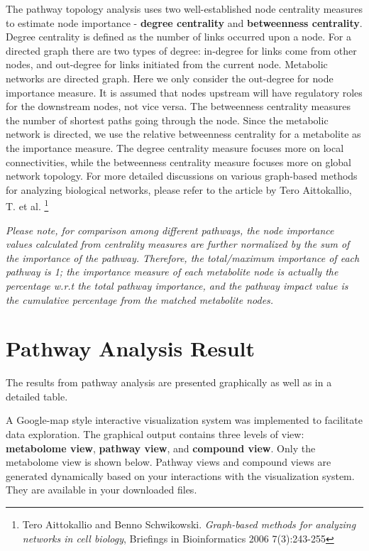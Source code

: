 \documentclass[a4paper]{article}
\begin{document}
The pathway topology analysis uses two well-established node centrality measures to estimate node importance - \textbf{degree centrality}
and \textbf{betweenness centrality}. Degree centrality is defined as the number of links occurred upon a node.
For a directed graph there are two types of degree: in-degree for links come from other nodes, and out-degree
for links initiated from the current node. Metabolic networks are directed graph. Here we only consider the
out-degree for node importance measure. It is assumed that nodes upstream will have regulatory roles for
the downstream nodes, not vice versa. The betweenness centrality measures the number of shortest paths going
through the node. Since the metabolic network is directed, we use the relative betweenness centrality for a metabolite
as the importance measure. The degree centrality measure focuses more on local connectivities, while the betweenness
centrality measure focuses more on global network topology. For more detailed discussions on various graph-based
methods for analyzing biological networks, please refer to the article by Tero Aittokallio, T. et al.
\footnote{Tero Aittokallio and Benno Schwikowski. \textit{Graph-based methods for analyzing networks in cell biology},
Briefings in Bioinformatics 2006 7(3):243-255}



\textit{Please note, for comparison among different pathways, the node importance values calculated from centrality measures
are further normalized by the sum of the importance of the pathway. Therefore, the total/maximum importance of each pathway
is 1; the importance measure of each metabolite node is actually the percentage w.r.t the total pathway importance,
and the pathway impact value is the cumulative percentage from the matched metabolite nodes.}





\section{Pathway Analysis Result}

The results from pathway analysis are presented graphically as well as in a detailed table.



A Google-map style interactive visualization system was implemented to facilitate data exploration.
The graphical output contains three levels of view: \textbf{metabolome view}, \textbf{pathway view},
and \textbf{compound view}. Only the metabolome view is shown below.
Pathway views and compound views are generated dynamically based on your interactions with the
visualization system. They are available in your downloaded files. 
\end{document}
